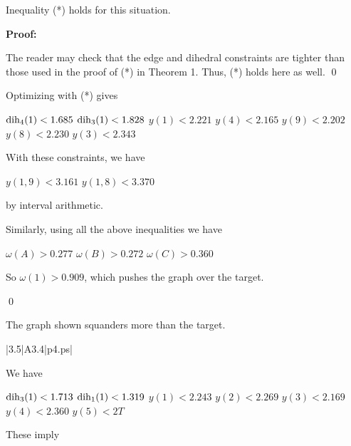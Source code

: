  Inequality (*) holds for this situation. \endproclaim

{\bf Proof:}

The reader may check that the edge and dihedral constraints are tighter than those used in the proof of (*) in Theorem 1.  Thus, (*) holds here as well. \qed

Optimizing with (*) gives

$\operatorname{dih}_4(1) < 1.685$ \newline
$\operatorname{dih}_3(1) < 1.828$ \newline
$y(1)<2.221$ \newline
$y(4)<2.165$ \newline
$y(9)<2.202$ \newline
$y(8)<2.230$ \newline
$y(3)<2.343$ \newline


With these constraints, we have

$y(1,9) < 3.161$ \newline
$y(1,8) < 3.370$ \newline

by interval arithmetic.

Similarly, using all the above inequalities we have

$\omega(A) > 0.277$ \newline
$\omega(B) > 0.272$ \newline
$\omega(C)> 0.360$ \newline

So $\omega(1)>0.909$, which pushes the graph over the target.

\qed


\bigskip



 The graph shown 
squanders more than the target.  \endproclaim

\gram|3.5|A3.4|p4.ps|  %

We have 

$\operatorname{dih}_3(1) < 1.713$ \newline
$\operatorname{dih}_1(1) < 1.319$ \newline
$y(1)<2.243$ \newline
$y(2)<2.269$ \newline
$y(3)<2.169$ \newline
$y(4)<2.360$ \newline
$y(5)<2T$ \newline

These imply 

